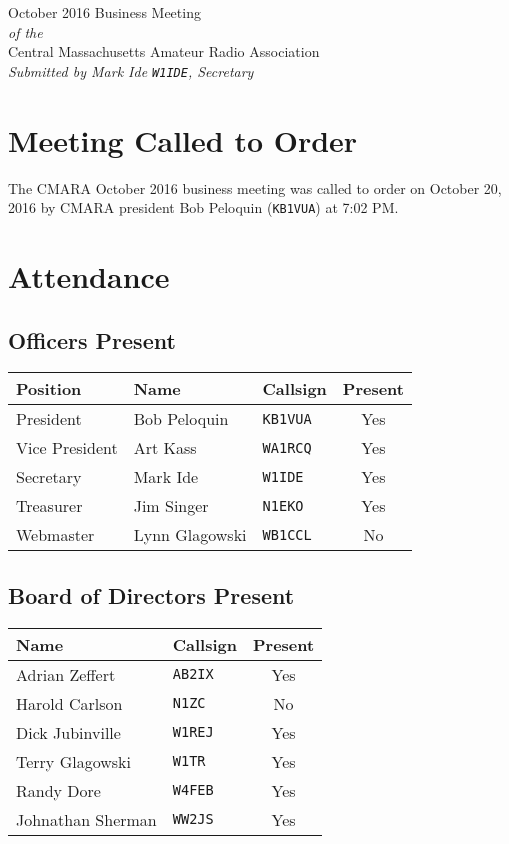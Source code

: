 \documentclass[10pt,letterpaper]{article}
\begin{document}
\begin{center}
{\huge October 2016 Business Meeting}\\
\emph{of the}\\
{\Large Central Massachusetts Amateur Radio Association}\\
\emph{Submitted by Mark Ide \texttt{W1IDE}, Secretary}
\end{center}

\section{Meeting Called to Order}
The CMARA October 2016 business meeting was called to order on October 20, 2016 by CMARA president Bob Peloquin (\texttt{KB1VUA}) at 7:02 PM.

\section{Attendance}

\subsection{Officers Present}

\begin{tabular}{|l|l|l|c|}
  \hline
  \textbf{Position} & \textbf{Name}  & \textbf{Callsign} & \textbf{Present} \\ \hline
  President         & Bob Peloquin   & \texttt{KB1VUA}   & Yes \\
  Vice President    & Art Kass       & \texttt{WA1RCQ}   & Yes \\
  Secretary         & Mark Ide       & \texttt{W1IDE}    & Yes \\
  Treasurer         & Jim Singer     & \texttt{N1EKO}    & Yes \\
  Webmaster         & Lynn Glagowski & \texttt{WB1CCL}   & No \\
  \hline
\end{tabular}

\subsection{Board of Directors Present}

\begin{tabular}{|l|l|c|}
  \hline
  \textbf{Name}     & \textbf{Callsign} & \textbf{Present} \\ \hline
  Adrian Zeffert    & \texttt{AB2IX}    & Yes \\
  Harold Carlson    & \texttt{N1ZC}     & No \\
  Dick Jubinville   & \texttt{W1REJ}    & Yes \\
  Terry Glagowski   & \texttt{W1TR}     & Yes \\
  Randy Dore        & \texttt{W4FEB}    & Yes \\
  Johnathan Sherman & \texttt{WW2JS}    & Yes \\
  \hline
\end{tabular}
\end{document}
